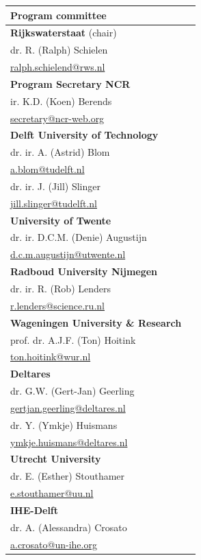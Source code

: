 
	\begin{table}
		\begin{tabular}[t]{ll}
        \textbf{Program committee}\\
        \hline
            \textbf{Rijkswaterstaat} (chair)\\
                dr. R. (Ralph) Schielen \\
                \url{ralph.schielend@rws.nl} \\
        	\textbf{Program Secretary NCR} \\
    	   	   ir. K.D. (Koen) Berends\\
    		  \url{secretary@ncr-web.org} \\
         	
    		\textbf{Delft University of Technology}\\
    		  dr. ir. A. (Astrid) Blom\\
    		  \url{a.blom@tudelft.nl}\\
        		dr. ir. J. (Jill) Slinger\\ 
        		\url{jill.slinger@tudelft.nl}\\
        	\textbf{University of Twente}\\
        		dr. ir. D.C.M. (Denie) Augustijn\\
        		\url{d.c.m.augustijn@utwente.nl}\\
    		\textbf{Radboud University Nijmegen}\\
        		dr. ir. R. (Rob) Lenders\\
        		\url{r.lenders@science.ru.nl}\\
            \textbf{Wageningen University \& Research}\\
                prof. dr. A.J.F. (Ton) Hoitink\\
                \url{ton.hoitink@wur.nl}\\
            \textbf{Deltares}\\
                dr. G.W. (Gert-Jan) Geerling\\
                \url{gertjan.geerling@deltares.nl}\\
                dr. Y. (Ymkje) Huismans \\
                \url{ymkje.huismans@deltares.nl}\\
            \textbf{Utrecht University}\\
                dr. E. (Esther) Stouthamer\\
                \url{e.stouthamer@uu.nl}\\
            \textbf{IHE-Delft}\\
                dr. A. (Alessandra) Crosato\\
                \url{a.crosato@un-ihe.org}\\
                

\end{tabular}
\end{table}
